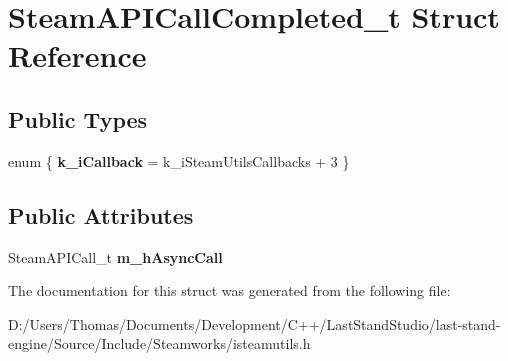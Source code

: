 \hypertarget{structSteamAPICallCompleted__t}{}\section{Steam\+A\+P\+I\+Call\+Completed\+\_\+t Struct Reference}
\label{structSteamAPICallCompleted__t}
\subsection*{Public Types}
\begin{DoxyCompactItemize}
\item 
\hypertarget{structSteamAPICallCompleted__t_a5be78455e37a6fc918eb3dbd663d4bc2}{}enum \{ {\bfseries k\+\_\+i\+Callback} = k\+\_\+i\+Steam\+Utils\+Callbacks + 3
 \}\label{structSteamAPICallCompleted__t_a5be78455e37a6fc918eb3dbd663d4bc2}

\end{DoxyCompactItemize}
\subsection*{Public Attributes}
\begin{DoxyCompactItemize}
\item 
\hypertarget{structSteamAPICallCompleted__t_a277d92c47fc823a6e52547049c491766}{}Steam\+A\+P\+I\+Call\+\_\+t {\bfseries m\+\_\+h\+Async\+Call}\label{structSteamAPICallCompleted__t_a277d92c47fc823a6e52547049c491766}

\end{DoxyCompactItemize}


The documentation for this struct was generated from the following file\+:\begin{DoxyCompactItemize}
\item 
D\+:/\+Users/\+Thomas/\+Documents/\+Development/\+C++/\+Last\+Stand\+Studio/last-\/stand-\/engine/\+Source/\+Include/\+Steamworks/isteamutils.\+h\end{DoxyCompactItemize}
